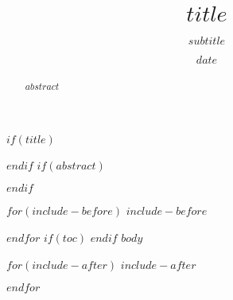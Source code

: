 \documentclass[$if(fontsize)$$fontsize$,$endif$$if(lang)$$lang$,$endif$$if(papersize)$$papersize$,$endif$$for(classoption)$$classoption$$sep$,$endfor$]{$documentclass$}
\title{$title$}
\subtitle{$subtitle$}
\date{$date$}
\begin{document}
$if(title)$
\maketitle
$endif$
$if(abstract)$
\begin{abstract}
$abstract$
\end{abstract}
$endif$

$for(include-before)$
$include-before$

$endfor$
$if(toc)$
{
\hypersetup{linkcolor=black}
\setcounter{tocdepth}{$toc-depth$}
\tableofcontents
}
$endif$
$body$

$for(include-after)$
$include-after$

$endfor$
\end{document}
